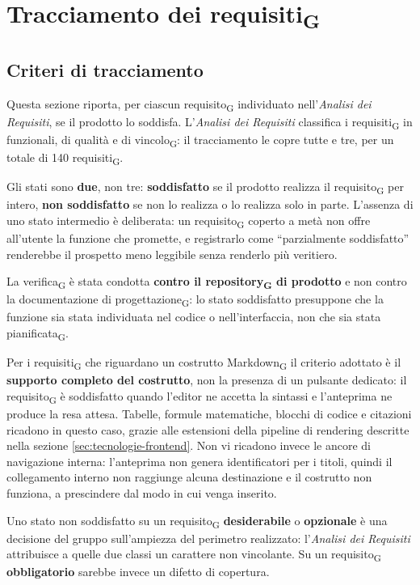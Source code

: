 \documentclass[a4paper, 10pt]{article}
\begin{document}
\section{Tracciamento dei requisiti\textsubscript{G}}
\label{sec:tracciamento}

\subsection{Criteri di tracciamento}
\label{sec:tracciamento-criteri}
Questa sezione riporta, per ciascun requisito\textsubscript{G} individuato nell'\textit{Analisi dei Requisiti}, se il prodotto lo soddisfa. L'\textit{Analisi dei Requisiti} classifica i requisiti\textsubscript{G} in funzionali, di qualità e di vincolo\textsubscript{G}: il tracciamento le copre tutte e tre, per un totale di 140 requisiti\textsubscript{G}.

Gli stati sono \textbf{due}, non tre: \textbf{soddisfatto} se il prodotto realizza il requisito\textsubscript{G} per intero, \textbf{non soddisfatto} se non lo realizza o lo realizza solo in parte. L'assenza di uno stato intermedio è deliberata: un requisito\textsubscript{G} coperto a metà non offre all'utente la funzione che promette, e registrarlo come ``parzialmente soddisfatto'' renderebbe il prospetto meno leggibile senza renderlo più veritiero.

La verifica\textsubscript{G} è stata condotta \textbf{contro il repository\textsubscript{G} di prodotto} e non contro la documentazione di progettazione\textsubscript{G}: lo stato soddisfatto presuppone che la funzione sia stata individuata nel codice o nell'interfaccia, non che sia stata pianificata\textsubscript{G}.

Per i requisiti\textsubscript{G} che riguardano un costrutto Markdown\textsubscript{G} il criterio adottato è il \textbf{supporto completo del costrutto}, non la presenza di un pulsante dedicato: il requisito\textsubscript{G} è soddisfatto quando l'editor ne accetta la sintassi e l'anteprima ne produce la resa attesa. Tabelle, formule matematiche, blocchi di codice e citazioni ricadono in questo caso, grazie alle estensioni della pipeline di rendering descritte nella sezione \ref{sec:tecnologie-frontend}. Non vi ricadono invece le ancore di navigazione interna: l'anteprima non genera identificatori per i titoli, quindi il collegamento interno non raggiunge alcuna destinazione e il costrutto non funziona, a prescindere dal modo in cui venga inserito.

Uno stato non soddisfatto su un requisito\textsubscript{G} \textbf{desiderabile} o \textbf{opzionale} è una decisione del gruppo sull'ampiezza del perimetro realizzato: l'\textit{Analisi dei Requisiti} attribuisce a quelle due classi un carattere non vincolante. Su un requisito\textsubscript{G} \textbf{obbligatorio} sarebbe invece un difetto di copertura.
\end{document}
